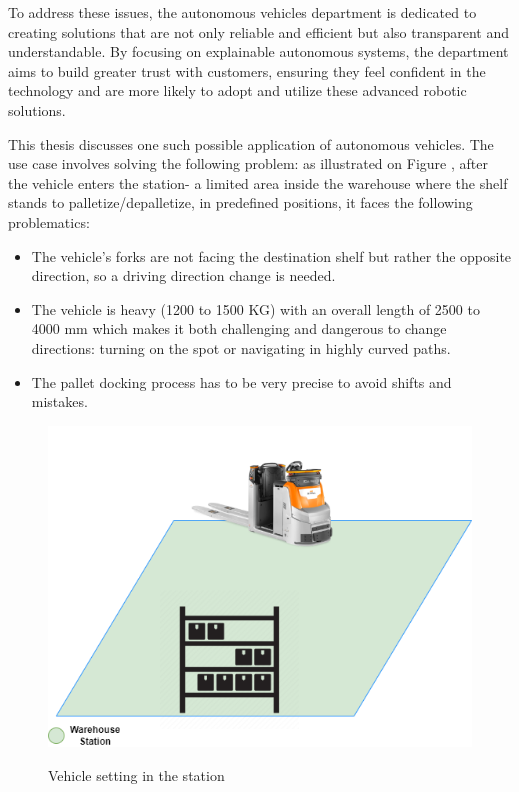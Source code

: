To address these issues, the autonomous vehicles department is dedicated to creating 
solutions that are not only reliable and efficient but also transparent and 
understandable. By focusing on explainable autonomous systems, the department aims 
to build greater trust with customers, ensuring they feel confident in the technology 
and are more likely to adopt and utilize these advanced robotic solutions. 

This thesis discusses one such possible application of autonomous vehicles. The use 
case involves solving the following problem: as illustrated on Figure , 
after the vehicle enters the station- a limited area inside the warehouse where the shelf stands 
to palletize/depalletize, in predefined positions, it faces the following problematics:  

\begin{itemize}
    \item The vehicle’s forks are not facing the destination shelf but rather the opposite direction, 
    so a driving direction change is needed. 

    \item The vehicle is heavy (1200 to 1500 KG) with an overall length of 2500 to 4000 mm  
    which makes it both challenging and dangerous to change directions: turning on the spot or 
    navigating in highly curved paths\cite{R5}. 
    
    \item The pallet docking process has to be very precise to avoid shifts and mistakes. 
\end{itemize}

\begin{figure}[H]
    \begin{center}
       \includegraphics[width=5in]{images/Chap0/station-sketch.drawio.png}\\
       \caption{Vehicle setting in the station}
       \label{docked station}
       \end{center}
\end{figure}


